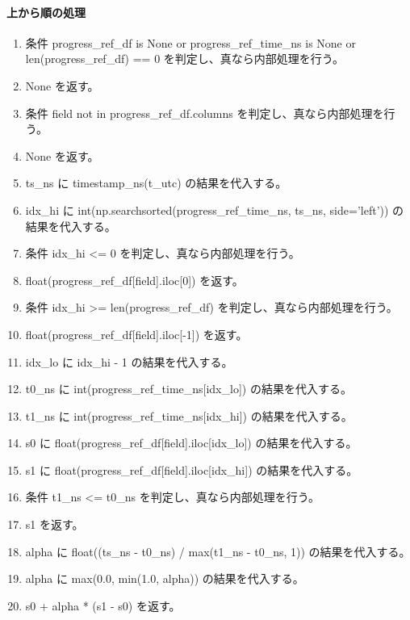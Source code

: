 \documentclass[a4paper,11pt]{article}
\begin{document}
            \paragraph{上から順の処理}
            \begin{enumerate}[leftmargin=1.8em]
            \item 条件 progress\_ref\_df is None or progress\_ref\_time\_ns is None or len(progress\_ref\_df) == 0 を判定し、真なら内部処理を行う。
\item   None を返す。
\item 条件 field not in progress\_ref\_df.columns を判定し、真なら内部処理を行う。
\item   None を返す。
\item ts\_ns に timestamp\_ns(t\_utc) の結果を代入する。
\item idx\_hi に int(np.searchsorted(progress\_ref\_time\_ns, ts\_ns, side='left')) の結果を代入する。
\item 条件 idx\_hi <= 0 を判定し、真なら内部処理を行う。
\item   float(progress\_ref\_df[field].iloc[0]) を返す。
\item 条件 idx\_hi >= len(progress\_ref\_df) を判定し、真なら内部処理を行う。
\item   float(progress\_ref\_df[field].iloc[-1]) を返す。
\item idx\_lo に idx\_hi - 1 の結果を代入する。
\item t0\_ns に int(progress\_ref\_time\_ns[idx\_lo]) の結果を代入する。
\item t1\_ns に int(progress\_ref\_time\_ns[idx\_hi]) の結果を代入する。
\item s0 に float(progress\_ref\_df[field].iloc[idx\_lo]) の結果を代入する。
\item s1 に float(progress\_ref\_df[field].iloc[idx\_hi]) の結果を代入する。
\item 条件 t1\_ns <= t0\_ns を判定し、真なら内部処理を行う。
\item   s1 を返す。
\item alpha に float((ts\_ns - t0\_ns) / max(t1\_ns - t0\_ns, 1)) の結果を代入する。
\item alpha に max(0.0, min(1.0, alpha)) の結果を代入する。
\item s0 + alpha * (s1 - s0) を返す。
            \end{enumerate}
\end{document}
